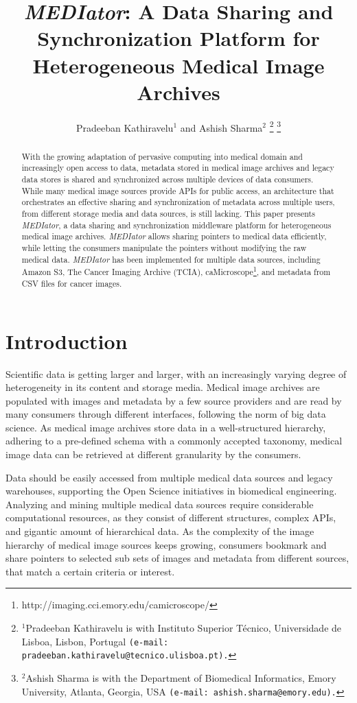 \documentclass[letterpaper, 10 pt, conference]{ieeeconf}  %
\title{\LARGE \bf
	\textit{MEDIator}: A Data Sharing and Synchronization Platform for Heterogeneous Medical Image Archives}
\author{Pradeeban Kathiravelu$^{1}$ and Ashish Sharma$^{2}$%
	\thanks{$^{1}$Pradeeban Kathiravelu is with Instituto Superior T\'{e}cnico, Universidade de Lisboa, Lisbon, Portugal
		{\tt\small (e-mail: pradeeban.kathiravelu@tecnico.ulisboa.pt).}}%
	\thanks{$^{2}$Ashish Sharma is with the Department of Biomedical Informatics, Emory University,
		Atlanta, Georgia, USA
		{\tt\small (e-mail: ashish.sharma@emory.edu).}}%
}
\begin{document}
	
	\maketitle
	\thispagestyle{empty}
	\pagestyle{empty}
	
\begin{abstract}
With the growing adaptation of pervasive computing into medical domain and increasingly open access to data, metadata stored in medical image archives and legacy data stores is shared and synchronized across multiple devices of data consumers. While many medical image sources provide APIs for public access, an architecture that orchestrates an effective sharing and synchronization of metadata across multiple users, from different storage media and data sources, is still lacking. This paper presents \textit{MEDIator}, a data sharing and synchronization middleware platform for heterogeneous medical image archives. \textit{MEDIator} allows sharing pointers to medical data efficiently, while letting the consumers manipulate the pointers without modifying the raw medical data. \textit{MEDIator} has been implemented for multiple data sources, including Amazon S3, The Cancer Imaging Archive (TCIA), caMicroscope\footnote{http://imaging.cci.emory.edu/camicroscope/}, and metadata from CSV files for cancer images.
\end{abstract}



\section{Introduction}
Scientific data is getting larger and larger, with an increasingly varying degree of heterogeneity in its content and storage media. Medical image archives are populated with images and metadata by a few source providers and are read by many consumers through different interfaces, following the norm of big data science. As medical image archives store data in a well-structured hierarchy, adhering to a pre-defined schema with a commonly accepted taxonomy, medical image data can be retrieved at different granularity by the consumers.

Data should be easily accessed from multiple medical data sources and legacy warehouses, supporting the Open Science initiatives in biomedical engineering. Analyzing and mining multiple medical data sources require considerable computational resources, as they consist of different structures, complex APIs, and gigantic amount of hierarchical data. As the complexity of the image hierarchy of medical image sources keeps growing, consumers bookmark and share pointers to selected sub sets of images and metadata from different sources, that match a certain criteria or interest. 
\end{document}
